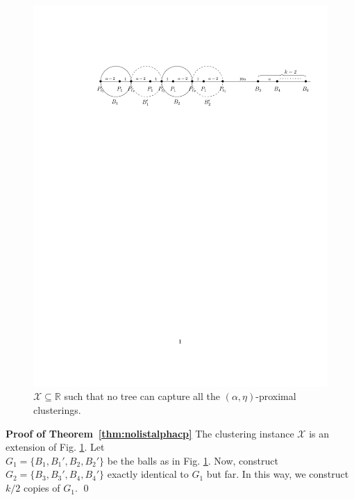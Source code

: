 \documentclass[letterpaper,12pt,titlepage,oneside,final]{book}
\newcommand{\mc}{\mathcal}
\begin{document}
\begin{figure}[!t]
\begin{center}
\includegraphics[trim={47mm 205mm 12mm 44mm},clip,width=\textwidth]{figures/lbdFig2.pdf}
\end{center}
\caption{$\mc X \subseteq \mathbb{R}$ such that no tree can capture all the $(\alpha, \eta)$-proximal clusterings.}
\label{fig:noalgalphacp}
\end{figure}

\noindent\textbf{Proof of Theorem~\ref{thm:nolistalphacp}}
The clustering instance $\mc X$ is an extension of Fig. \ref{fig:noalgalphacp}. Let  \\$G_1 = \{B_1, B_1', B_2, B_2'\}$ be the balls as in Fig. \ref{fig:noalgalphacp}. Now, construct $G_2 = \{B_3, B_3', B_4, B_4'\}$ exactly identical to $G_1$ but far. In this way, we construct $k/2$ copies of $G_1$. \qed\\
\end{document}
